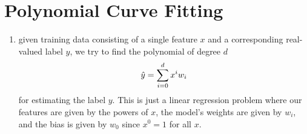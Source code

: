 \section{Polynomial Curve Fitting \cite{dnn-1}}\label{Polynomial Curve Fitting}

\begin{enumerate}[itemsep=0.2cm]
    \item given training data consisting of a single feature $x$ and a corresponding real-valued label $y$, we try to find the polynomial of degree $d$
    \[
        \hfill
        \hat{y}= \dsum_{i=0}^d x^i w_i
        \hfill
    \]
    for estimating the label $y$. This is just a linear regression problem where our features are given by the powers of $x$, the model’s weights are given by $w_i$, and the bias is given by $w_0$ since $x^0 = 1$ for all $x$. 

\end{enumerate}















